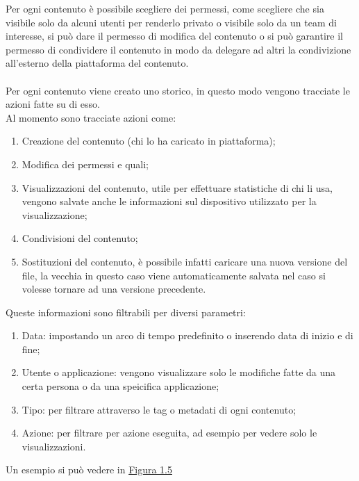 \documentclass[a4paper, 12pt, twoside, openright]{book}
\begin{document}
Per ogni contenuto è possibile scegliere dei permessi, come scegliere che sia visibile solo da alcuni utenti per renderlo privato o visibile solo da un team di interesse, si può dare il permesso di modifica del contenuto o si può garantire il permesso di condividere il contenuto in modo da delegare ad altri la condivizione all'esterno della piattaforma del contenuto.\\ \\
Per ogni contenuto viene creato uno storico, in questo modo vengono tracciate le azioni fatte su di esso.\\
Al momento sono tracciate azioni come:
\begin{enumerate}
\item Creazione del contenuto (chi lo ha caricato in piattaforma);
\item Modifica dei permessi e quali;
\item Visualizzazioni del contenuto, utile per effettuare statistiche di chi li usa, vengono salvate anche le informazioni sul dispositivo utilizzato per la visualizzazione;
\item Condivisioni del contenuto;
\item Sostituzioni del contenuto, è possibile infatti caricare una nuova versione del file, la vecchia in questo caso viene automaticamente salvata nel caso si volesse tornare ad una versione precedente.
\end{enumerate}
Queste informazioni sono filtrabili per diversi parametri:
\begin{enumerate}
\item Data: impostando un arco di tempo predefinito o inserendo data di inizio e di fine;
\item Utente o applicazione: vengono visualizzare solo le modifiche fatte da una certa persona o da una speicifica applicazione;
\item Tipo: per filtrare attraverso le tag o metadati di ogni contenuto;
\item Azione: per filtrare per azione eseguita, ad esempio per vedere solo le visualizzazioni.
\end{enumerate}
Un esempio si può vedere in \hyperref[content-history]{Figura 1.5}
\end{document}
